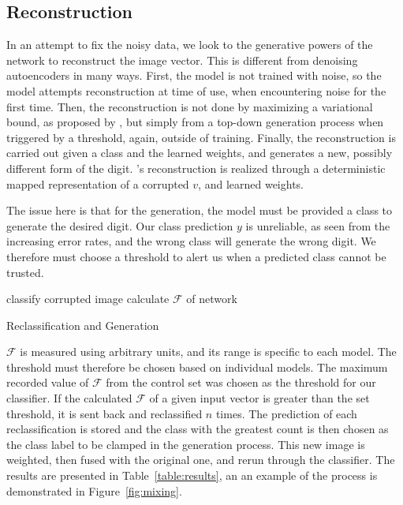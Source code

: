 \documentclass{report}
\begin{document}
\subsection{Reconstruction}
In an attempt to fix the noisy data, we look to the generative powers of the network to reconstruct the image vector. This is different from denoising autoencoders in many ways. First, the model is not trained with noise, so the model attempts reconstruction at time of use, when encountering noise for the first time. Then, the reconstruction is not done by maximizing a variational bound, as proposed by \citep{Vincent}, but simply from a top-down generation process when triggered by a threshold, again, outside of training. Finally, the reconstruction is carried out given a class and the learned weights, and generates a new, possibly different form of the digit. \citep{Vincent}'s reconstruction is realized through a deterministic mapped representation of a corrupted $v$, and learned weights.

The issue here is that for the generation, the model must be provided a class to generate the desired digit. Our class prediction $y$ is unreliable, as seen from the increasing error rates, and the wrong class will generate the wrong digit. We therefore must choose a threshold to alert us when a predicted class cannot be trusted.


\begin{algorithm}[H]
  classify corrupted image\;
  calculate $\mathcal{F}$ of network\;
 \caption{Reclassification and Generation}
\end{algorithm}


$\mathcal{F}$ is measured using arbitrary units, and its range is specific to each model. The threshold must therefore be chosen based on individual models. The maximum recorded value of $\mathcal{F}$ from the control set was chosen as the threshold for our classifier. If the calculated $\mathcal{F}$ of a given input vector is greater than the set threshold, it is sent back and reclassified $n$ times. The prediction of each reclassification is stored and the class with the greatest count is then chosen as the class label to be clamped in the generation process. This new image is weighted, then fused with the original one, and rerun through the classifier. The results are presented in Table~\ref{table:results}, an an example of the process is demonstrated in Figure~\ref{fig:mixing}.
\end{document}
